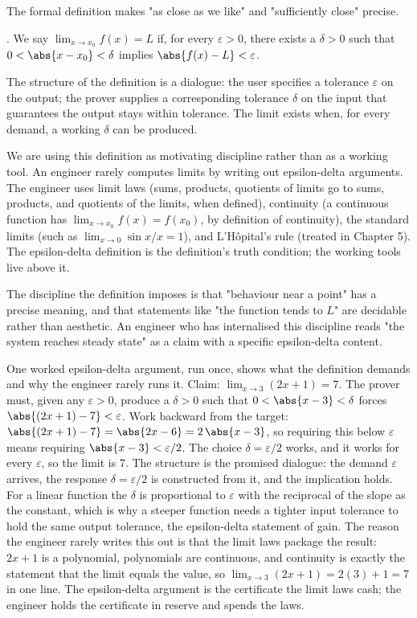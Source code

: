 The formal definition makes "as close as we like" and "sufficiently
close" precise.

. We say $\lim_{x \to x_{0}} f(x) = L$ if,
for every $\varepsilon > 0$, there exists a $\delta > 0$ such that
$0 < \abs{x - x_{0}} < \delta$ implies $\abs{f(x) - L} < \varepsilon$.

The structure of the definition is a dialogue: the user specifies a
tolerance $\varepsilon$ on the output; the prover supplies a
corresponding tolerance $\delta$ on the input that guarantees the
output stays within tolerance. The limit exists when, for every demand,
a working $\delta$ can be produced.

We are using this definition as motivating discipline rather than as a
working tool. An engineer rarely computes limits by writing out
epsilon-delta arguments. The engineer uses limit laws (sums, products,
quotients of limits go to sums, products, and quotients of the limits,
when defined), continuity (a continuous function has $\lim_{x \to x_{0}}
f(x) = f(x_{0})$, by definition of continuity), the standard limits
(such as $\lim_{x \to 0} \sin x / x = 1$), and L'H\^{o}pital's rule
(treated in Chapter 5). The epsilon-delta definition is the
definition's truth condition; the working tools live above it.

The discipline the definition imposes is that "behaviour near a point"
has a precise meaning, and that statements like "the function tends to
$L$" are decidable rather than aesthetic. An engineer who has internalised
this discipline reads "the system reaches steady state" as a claim with a
specific epsilon-delta content.

One worked epsilon-delta argument, run once, shows what the definition
demands and why the engineer rarely runs it. Claim: $\lim_{x \to 3}
(2x + 1) = 7$. The prover must, given any $\varepsilon > 0$, produce a
$\delta > 0$ such that $0 < \abs{x - 3} < \delta$ forces $\abs{(2x + 1)
- 7} < \varepsilon$. Work backward from the target: $\abs{(2x + 1) - 7}
= \abs{2x - 6} = 2\,\abs{x - 3}$, so requiring this below $\varepsilon$
means requiring $\abs{x - 3} < \varepsilon/2$. The choice $\delta =
\varepsilon/2$ works, and it works for every $\varepsilon$, so the limit
is $7$. The structure is the promised dialogue: the demand
$\varepsilon$ arrives, the response $\delta = \varepsilon/2$ is
constructed from it, and the implication holds. For a linear function the
$\delta$ is proportional to $\varepsilon$ with the reciprocal of the
slope as the constant, which is why a steeper function needs a tighter
input tolerance to hold the same output tolerance, the epsilon-delta
statement of gain. The reason the engineer rarely writes this out is that
the limit laws package the result: $2x + 1$ is a polynomial, polynomials
are continuous, and continuity is exactly the statement that the limit
equals the value, so $\lim_{x \to 3}(2x + 1) = 2(3) + 1 = 7$ in one line.
The epsilon-delta argument is the certificate the limit laws cash; the
engineer holds the certificate in reserve and spends the laws.

